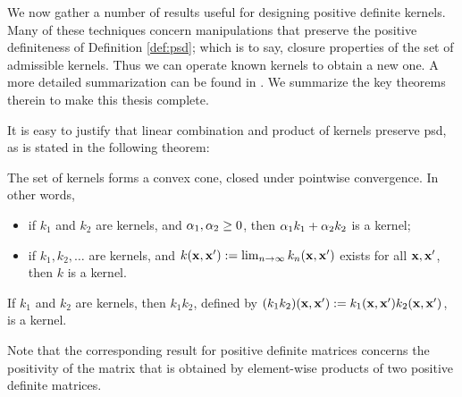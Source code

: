 We now gather a number of results useful for designing positive definite kernels. Many of these techniques concern manipulations that preserve the positive definiteness of Definition \ref{def:psd}; which is to say, closure properties of the set of admissible kernels. Thus we can operate known kernels to obtain a new one. A more detailed summarization can be found in \cite{Scholkopf2002}. We summarize the key theorems therein to make this thesis complete.

It is easy to justify that linear combination and product of kernels preserve psd, as is stated in the following theorem:
\begin{theorem}
The set of kernels forms a convex cone, closed under pointwise convergence. In other words,
\begin{itemize}
  \item if $k_1$ and $k_2$ are kernels, and ${\alpha}_1,{\alpha}_2\geq 0$, then ${\alpha}_1k_1+{\alpha}_2k_2$ is a kernel;
  \item if $k_1,k_2,\ldots$ are kernels, and $k(\mathbf{x},\mathbf{x}'):=\lim_{n\rightarrow\infty}k_n(\mathbf{x},\mathbf{x}')$ exists for all $\mathbf{x},\mathbf{x}'$, then $k$ is a kernel.
\end{itemize}
\end{theorem}
\begin{theorem}
If $k_1$ and $k_2$ are kernels, then $k_1k_2$, defined by $(k_1k_2)(\mathbf{x},\mathbf{x}'):=k_1(\mathbf{x},\mathbf{x}')k_2(\mathbf{x},\mathbf{x}')$, is a kernel.
\end{theorem}
Note that the corresponding result for positive definite matrices concerns the positivity of the matrix that is obtained by element-wise products of two positive definite matrices.

